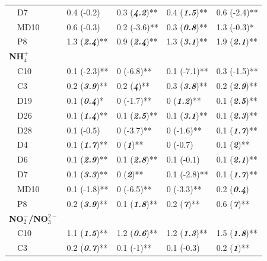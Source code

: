 \documentclass[journal = esthag, manuscript = article]{achemso}\usepackage[]{graphicx}\usepackage[]{color}
\begin{document}
\begin{suppinfo}
\begin{table}[!tbp]
\begin{center}
\begin{tabular}{lllll}
~~D7&0.4 \footnotesize{(-0.2)}&0.3 \footnotesize{(\textit{\textbf{4.2}})**}&0.4 \footnotesize{(\textit{\textbf{1.5}})**}&0.6 \footnotesize{(-2.4)**}\tabularnewline
~~MD10&0.6 \footnotesize{(-0.3)}&0.2 \footnotesize{(-3.6)**}&0.3 \footnotesize{(\textit{\textbf{0.8}})**}&1.3 \footnotesize{(-0.3)*}\tabularnewline
~~P8&1.3 \footnotesize{(\textit{\textbf{2.4}})**}&0.9 \footnotesize{(\textit{\textbf{2.4}})**}&1.3 \footnotesize{(\textit{\textbf{3.1}})**}&1.9 \footnotesize{(\textit{\textbf{2.1}})**}\tabularnewline
\hline
{\bfseries NH$_{4}^{+}$}&&&&\tabularnewline
~~C10&0.1 \footnotesize{(-2.3)**}&0 \footnotesize{(-6.8)**}&0.1 \footnotesize{(-7.1)**}&0.3 \footnotesize{(-1.5)**}\tabularnewline
~~C3&0.2 \footnotesize{(\textit{\textbf{3.9}})**}&0.2 \footnotesize{(\textit{\textbf{4}})**}&0.3 \footnotesize{(\textit{\textbf{3.8}})**}&0.2 \footnotesize{(\textit{\textbf{2.9}})**}\tabularnewline
~~D19&0.1 \footnotesize{(\textit{\textbf{0.4}})*}&0 \footnotesize{(-1.7)**}&0 \footnotesize{(\textit{\textbf{1.2}})**}&0.1 \footnotesize{(\textit{\textbf{2.5}})**}\tabularnewline
~~D26&0.1 \footnotesize{(\textit{\textbf{1.4}})**}&0.1 \footnotesize{(\textit{\textbf{2.5}})**}&0.1 \footnotesize{(\textit{\textbf{3.1}})**}&0.1 \footnotesize{(\textit{\textbf{2.3}})**}\tabularnewline
~~D28&0.1 \footnotesize{(-0.5)}&0 \footnotesize{(-3.7)**}&0 \footnotesize{(-1.6)**}&0.1 \footnotesize{(\textit{\textbf{1.7}})**}\tabularnewline
~~D4&0.1 \footnotesize{(\textit{\textbf{1.7}})**}&0 \footnotesize{(\textit{\textbf{1}})**}&0 \footnotesize{(-0.7)}&0.1 \footnotesize{(\textit{\textbf{2}})**}\tabularnewline
~~D6&0.1 \footnotesize{(\textit{\textbf{2.9}})**}&0.1 \footnotesize{(\textit{\textbf{2.8}})**}&0.1 \footnotesize{(-0.1)}&0.1 \footnotesize{(\textit{\textbf{2.1}})**}\tabularnewline
~~D7&0.1 \footnotesize{(\textit{\textbf{3.3}})**}&0 \footnotesize{(\textit{\textbf{2}})**}&0.1 \footnotesize{(-2.8)**}&0.1 \footnotesize{(\textit{\textbf{1.7}})**}\tabularnewline
~~MD10&0.1 \footnotesize{(-1.8)**}&0 \footnotesize{(-6.5)**}&0 \footnotesize{(-3.3)**}&0.2 \footnotesize{(\textit{\textbf{0.4}})}\tabularnewline
~~P8&0.2 \footnotesize{(\textit{\textbf{3.9}})**}&0.1 \footnotesize{(\textit{\textbf{1.8}})**}&0.2 \footnotesize{(\textit{\textbf{7}})**}&0.6 \footnotesize{(\textit{\textbf{7}})**}\tabularnewline
\hline
{\bfseries NO$_{2}^{-}$/NO$_{3}^{2-}$}&&&&\tabularnewline
~~C10&1.1 \footnotesize{(\textit{\textbf{1.5}})**}&1.2 \footnotesize{(\textit{\textbf{0.6}})**}&1.2 \footnotesize{(\textit{\textbf{1.3}})**}&1.5 \footnotesize{(\textit{\textbf{1.8}})**}\tabularnewline
~~C3&0.2 \footnotesize{(\textit{\textbf{0.7}})**}&0.1 \footnotesize{(-1)**}&0.1 \footnotesize{(-0.3)}&0.2 \footnotesize{(\textit{\textbf{1}})**}\tabularnewline

\end{tabular}
\end{center}
\end{table}
\end{suppinfo}
\end{document}
